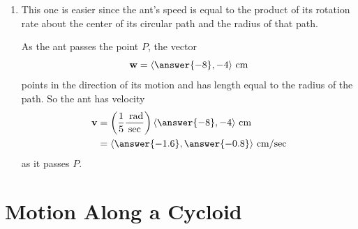 \documentclass{ximera}
\begin{document}
\begin{question}
\begin{explanation}
\begin{enumerate}
So the beetle's velocity as it passes the point $P$ is
\begin{align*}
   {\bf v}  &= {\bf w} \left( \frac{v}{|{\bf w}|} \right)  \\
               &= \left \langle  \answer{\frac{-36}{\sqrt{130}}} ,  \answer{\frac{-132}{\sqrt{130}}}\right \rangle \frac{\text{cm}}{\text{sec}}.
\end{align*}

\item This one is easier since the ant's speed is equal to the product of its rotation rate about the center of its circular path and the radius of that path.

As the ant passes the point $P$, the vector
\[
 {\bf w} = \langle  \answer{-8} , {-4} \rangle \text{ cm}
\]
points in the direction of its motion and has length equal to the radius of the path. So the ant has velocity
\begin{align*}
   {\bf v} &= \left( \frac{1}{5} \frac{\text{ rad}}{\text{sec}}\right)  \langle  \answer{-8} , {-4} \rangle \text{ cm}  \\
              &= \langle \answer{-1.6} , \answer{-0.8} \rangle \text{ cm/sec} 
\end{align*}
as it passes $P$.
\end{enumerate}
\end{explanation}
\end{question}


\section{Motion Along a Cycloid}
\end{document}
